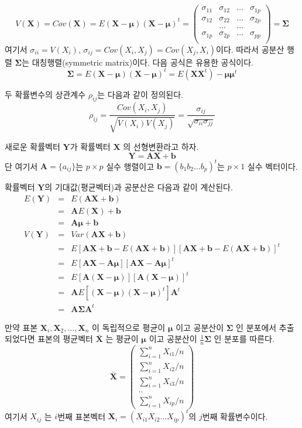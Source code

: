 \documentclass[
  10pt,
]{book}
\theoremstyle{definition}
\theoremstyle{definition}
\theoremstyle{definition}
\theoremstyle{definition}
\theoremstyle{remark}
\begin{document}
\begin{equation*}
V(\bm X) =Cov(\bm X) = E (\bm X-\bm \mu) (\bm X-\bm \mu)^t 
= 
  \begin{pmatrix}
\sigma_{11} & \sigma_{12} & \dots & \sigma_{1p} \\
\sigma_{12} & \sigma_{22} & \dots & \sigma_{2p} \\
& \dots & \dots & \\
\sigma_{1p} & \sigma_{2p} & \dots & \sigma_{pp} \\
\end{pmatrix}
= \bm \Sigma
\end{equation*}
여기서 \(\sigma_{ii}=V(X_i)\), \(\sigma_{ij} = Cov(X_i, X_j)=Cov(X_j, X_i)\)이다. 따라서 공분산 행렬
\(\bm \Sigma\)는 대칭행렬(symmetric matrix)이다. 다음 공식은 유용한 공식이다.
\[ \bm \Sigma = E (\bm X-\bm \mu) (\bm X-\bm \mu)^t  = E(\bm X \bm X^t)-\bm \mu \bm \mu^t \]

두 확률변수의 상관계수 \(\rho_{ij}\)는 다음과 같이 정의된다.
\[ \rho_{ij} = \frac{Cov(X_i, X_j)}{ \sqrt{V(X_i) V(X_j)}} = \frac{\sigma_{ij}}{\sqrt{\sigma_{ii}
  \sigma_{jj}}} \]

새로운 확률벡터 \(\bm Y\)가 확률벡터 \(\bm X\) 의 선형변환라고 하자.
\[ \bm Y = \bm A  \bm X + \bm b \]
단 여기서 \(\bm A = \{ a_{ij} \}\)는 \(p \times p\) 실수 행렬이고
\(\bm b =(b_1 b_2 \dots b_p)^t\)는 \(p \times 1\) 실수 벡터이다.

확률벡터 \(\bm Y\)의 기대값(평균벡터)과 공분산은 다음과 같이 계산된다.
\begin{eqnarray*}
E(\bm Y ) &=& E(\bm A \bm X+ \bm b) \\
&=& \bm A E(\bm X)+ \bm b \\
&=& \bm A \bm \mu+ \bm b \\
V(\bm Y) &=& Var(\bm A \bm X+ \bm b) \\
&=& E[\bm A \bm X+ \bm b -E(\bm A \bm X+ \bm b)] [\bm A \bm X+ \bm b -E(\bm A \bm X+ \bm b)]^t \\
&=& E[\bm A \bm X -  \bm A \bm \mu] [\bm A \bm X -  \bm A \bm \mu]^t \\
&=& E[\bm A (\bm X - \bm \mu)] [\bm A (\bm X - \bm \mu)]^t \\
&=& \bm A E [(\bm X - \bm \mu) (\bm X - \bm \mu)^t] \bm A^t \\
&=& \bm A \bm \Sigma \bm A^t
\end{eqnarray*}

만약 표본 \(\bm X_i, \bm X_2, \dots, \bm X_n\) 이 독립적으로 평균이 \(\bm \mu\) 이고 공분산이 \(\bm \Sigma\)
인 분포에서 추출되었다면 표본의 평균벡터 \(\bar {\bm X}\) 는 평균이 \(\bm \mu\) 이고 공분산이 \(\frac{1}{n}\bm \Sigma\)
인 분포를 따른다.
\begin{equation*}
\bar {\bm X} =
  \begin{pmatrix}
\sum_{i=1}^n X_{i1} / n  \\
\sum_{i=1}^n X_{i2} / n \\
\sum_{i=1}^n X_{i3} / n \\
..  \\
\sum_{i=1}^n X_{ip} / n 
\end{pmatrix}
\end{equation*}
여기서 \(X_{ij}\) 는 \(i\)번째 표본벡터 \(\bm X_i =(X_{i1} X_{i2} \dots X_{ip})^t\)의 \(j\)번째 확률변수이다.
\end{document}
